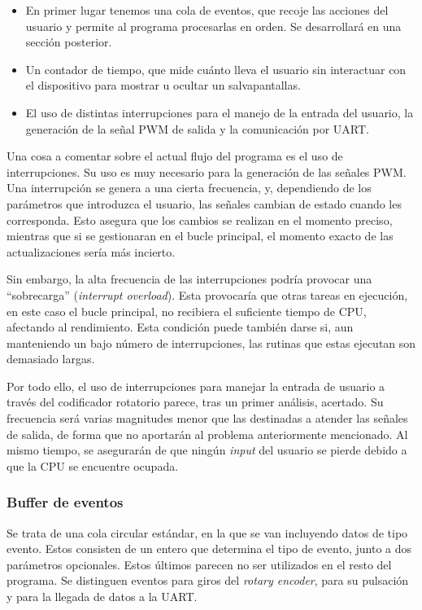 \begin{itemize}
    \item En primer lugar tenemos una cola de eventos, que recoje las acciones del usuario y permite al programa procesarlas en orden. Se desarrollará en una sección posterior.
    \item Un contador de tiempo, que mide cuánto lleva el usuario sin interactuar con el dispositivo para mostrar u ocultar un salvapantallas.
    \item El uso de distintas interrupciones para el manejo de la entrada del usuario, la generación de la señal PWM de salida y la comunicación por UART. \end{itemize}

Una cosa a comentar sobre el actual flujo del programa es el uso de interrupciones. Su uso es muy necesario para la generación de las señales PWM. Una interrupción se genera a una cierta frecuencia, y, dependiendo de los parámetros que introduzca el usuario, las señales cambian de estado cuando les corresponda. Esto asegura que los cambios se realizan en el momento preciso, mientras que si se gestionaran en el bucle principal, el momento exacto de las actualizaciones sería más incierto.

Sin embargo, la alta frecuencia de las interrupciones podría provocar una ``sobrecarga'' (\textit{interrupt overload}). Esta provocaría que otras tareas en ejecución, en este caso el bucle principal, no recibiera el suficiente tiempo de CPU, afectando al rendimiento. Esta condición puede también darse si, aun manteniendo un bajo número de interrupciones, las rutinas que estas ejecutan son demasiado largas.

Por todo ello, el uso de interrupciones para manejar la entrada de usuario a través del codificador rotatorio parece, tras un primer análisis, acertado. Su frecuencia será varias magnitudes menor que las destinadas a atender las señales de salida, de forma que no aportarán al problema anteriormente mencionado. Al mismo tiempo, se asegurarán de que ningún \textit{input} del usuario se pierde debido a que la CPU se encuentre ocupada. \cite{chapman}

\subsubsection{Buffer de eventos} Se trata de una cola circular estándar, en la que se van incluyendo datos de tipo evento. Estos consisten de un entero que determina el tipo de evento, junto a dos parámetros opcionales. Estos últimos parecen no ser utilizados en el resto del programa. Se distinguen eventos para giros del \textit{rotary encoder}, para su pulsación y para la llegada de datos a la UART.

